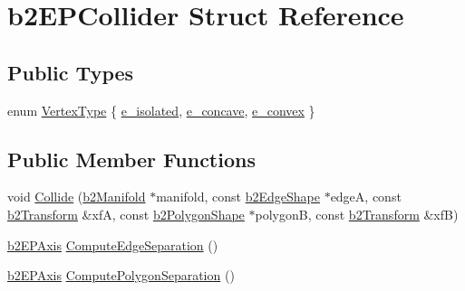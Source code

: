 \hypertarget{structb2_e_p_collider}{}\section{b2\+E\+P\+Collider Struct Reference}
\label{structb2_e_p_collider}
\subsection*{Public Types}
\begin{DoxyCompactItemize}
\item 
enum \mbox{\hyperlink{structb2_e_p_collider_aa50efcaf41cf85e167d0244f5d6f00e8}{Vertex\+Type}} \{ \mbox{\hyperlink{structb2_e_p_collider_aa50efcaf41cf85e167d0244f5d6f00e8aa110c80e7d5e208dcc8251be8ce5ddf9}{e\+\_\+isolated}}, 
\mbox{\hyperlink{structb2_e_p_collider_aa50efcaf41cf85e167d0244f5d6f00e8a6e7cbdd93aaa170b9d3cf35aadd4a23e}{e\+\_\+concave}}, 
\mbox{\hyperlink{structb2_e_p_collider_aa50efcaf41cf85e167d0244f5d6f00e8aa787eb06eaef55d95e0dd2b4e205c6b2}{e\+\_\+convex}}
 \}
\end{DoxyCompactItemize}
\subsection*{Public Member Functions}
\begin{DoxyCompactItemize}
\item 
void \mbox{\hyperlink{structb2_e_p_collider_a22f13698b4adde74b9bdb705f59f9778}{Collide}} (\mbox{\hyperlink{structb2_manifold}{b2\+Manifold}} $\ast$manifold, const \mbox{\hyperlink{classb2_edge_shape}{b2\+Edge\+Shape}} $\ast$edgeA, const \mbox{\hyperlink{structb2_transform}{b2\+Transform}} \&xfA, const \mbox{\hyperlink{classb2_polygon_shape}{b2\+Polygon\+Shape}} $\ast$polygonB, const \mbox{\hyperlink{structb2_transform}{b2\+Transform}} \&xfB)
\item 
\mbox{\hyperlink{structb2_e_p_axis}{b2\+E\+P\+Axis}} \mbox{\hyperlink{structb2_e_p_collider_a105a28c48afe6dc4158e6d5d303bf5e1}{Compute\+Edge\+Separation}} ()
\item 
\mbox{\hyperlink{structb2_e_p_axis}{b2\+E\+P\+Axis}} \mbox{\hyperlink{structb2_e_p_collider_a46c340d43b25b776db8356c5b0249002}{Compute\+Polygon\+Separation}} ()
\end{DoxyCompactItemize}
